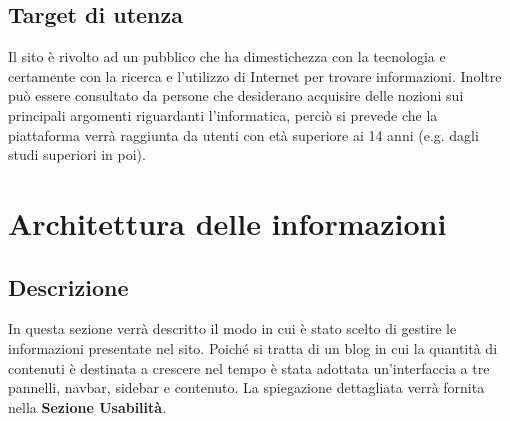 \documentclass[12pt]{article}
\begin{document}
	\subsection{Target di utenza}
		Il sito è rivolto ad un pubblico che ha dimestichezza con la tecnologia e certamente con la ricerca e l'utilizzo di Internet per trovare informazioni. Inoltre può essere consultato da persone che desiderano acquisire delle nozioni sui principali argomenti riguardanti l'informatica, perciò si prevede che la piattaforma verrà raggiunta da utenti con età superiore ai 14 anni (e.g. dagli studi superiori in poi).
		
	\section{Architettura delle informazioni}
	\subsection{Descrizione}
		In questa sezione verrà descritto il modo in cui è stato scelto di gestire le informazioni presentate nel sito. Poiché si tratta di un blog in cui la quantità di contenuti è destinata a crescere nel tempo è stata adottata un'interfaccia a tre pannelli, navbar, sidebar e contenuto. La spiegazione dettagliata verrà fornita nella \textbf{Sezione \textbf{Usabilità}}.
\end{document}
